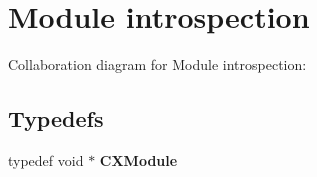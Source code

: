 \hypertarget{group__CINDEX__MODULE}{}\section{Module introspection}
\label{group__CINDEX__MODULE}
Collaboration diagram for Module introspection\+:
\subsection*{Typedefs}
\begin{DoxyCompactItemize}
\item 
\mbox{\label{group__CINDEX__MODULE_ga8b7b9a4a5faa82fdf95aebdfebc5859c}} 
typedef void $\ast$ {\bfseries C\+X\+Module}
\end{DoxyCompactItemize}
